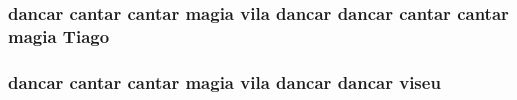 \subsubsection[{\texorpdfstring{Tiago}{Tiago}}]{ {\bf dancar} {\bf cantar} {\bf cantar} {\bf magia} vila {\bf dancar} {\bf dancar} {\bf cantar} {\bf cantar} {\bf magia} Tiago}\hypertarget{jurados_8txt_a5de05656aa2c1e4f1d006ab2c91402f2}{}\label{jurados_8txt_a5de05656aa2c1e4f1d006ab2c91402f2}
\subsubsection[{\texorpdfstring{viseu}{viseu}}]{ {\bf dancar} {\bf cantar} {\bf cantar} {\bf magia} vila {\bf dancar} {\bf dancar} viseu}\hypertarget{jurados_8txt_a039cea9e32d50e312178ae96d1d2b0b4}{}\label{jurados_8txt_a039cea9e32d50e312178ae96d1d2b0b4}
